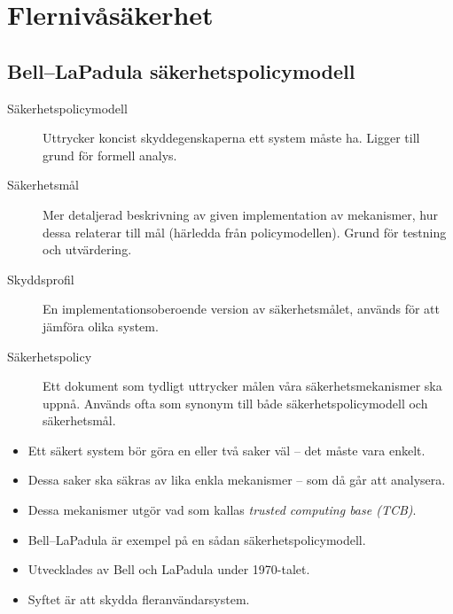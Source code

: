 \mode*




\section{Flernivåsäkerhet}

\subsection{Bell--LaPadula säkerhetspolicymodell}
\begin{frame}{\insertsubsectionhead}
  \begin{description}
    \item[Säkerhetspolicymodell] Uttrycker koncist skyddegenskaperna ett system 
      måste ha.
      Ligger till grund för formell analys.
    \item[Säkerhetsmål] Mer detaljerad beskrivning av given implementation av 
      mekanismer, hur dessa relaterar till mål (härledda från policymodellen).
      Grund för testning och utvärdering.
    \item[Skyddsprofil] En implementationsoberoende version av säkerhetsmålet, 
      används för att jämföra olika system.
    \item[Säkerhetspolicy] Ett dokument som tydligt uttrycker målen våra 
      säkerhetsmekanismer ska uppnå.
      Används ofta som synonym till både säkerhetspolicymodell och 
      säkerhetsmål.
  \end{description}
\end{frame}
\begin{frame}{\insertsubsectionhead}
  \begin{itemize}
    \item Ett säkert system bör göra en eller två saker väl -- det måste vara 
      enkelt.
    \item Dessa saker ska säkras av lika enkla mekanismer -- som då går att 
      analysera.
    \item Dessa mekanismer utgör vad som kallas \emph{trusted computing base 
      (TCB)}.
    \item Bell--LaPadula är exempel på en sådan säkerhetspolicymodell.
    \item Utvecklades av Bell och LaPadula under 1970-talet.
    \item Syftet är att skydda fleranvändarsystem.
  \end{itemize}
\end{frame}
